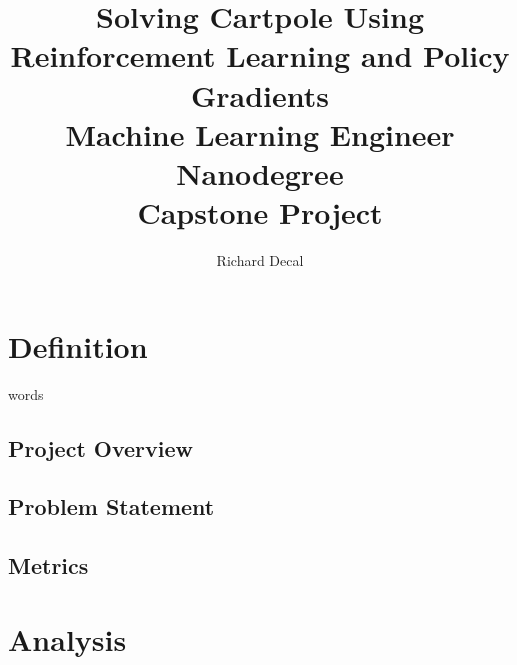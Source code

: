 \documentclass[12pt,a4paper]{article}
\author{Richard Decal}
\title{%
  Solving Cartpole Using Reinforcement Learning and Policy Gradients \\
  \large Machine Learning Engineer Nanodegree\\
  Capstone Project}
\begin{document}
\maketitle


\section{Definition}
words
\subsection*{Project Overview}
%
\subsection*{Problem Statement}
%
\subsection*{Metrics}
%
%
\section{Analysis}
%
\end{document}
